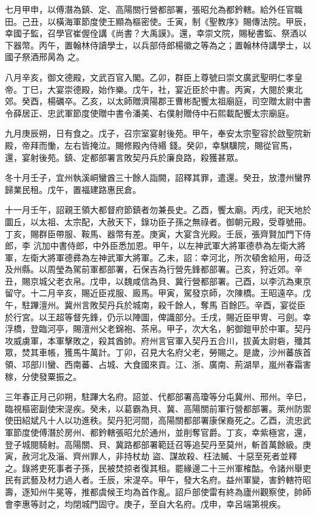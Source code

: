 \begin{pinyinscope}
 七月甲申，以傅潛為鎮、定、高陽關行營都部署，張昭允為都鈐轄。給外任官職田。己丑，以橫海軍節度使王顯為樞密使。壬寅，制《聖教序》賜傳法院。甲辰，幸國子監，召學官崔偓佺講《尚書？大禹謨》。還，幸崇文院，賜秘書監、祭酒以下器幣。丙午，置翰林侍讀學士，以兵部侍郎楊徽之等為之；置翰林侍講學士，以國子祭酒邢昺為
 之。



 八月辛亥，御文德殿，文武百官入閣。乙卯，群臣上尊號曰崇文廣武聖明仁孝皇帝。丁巳，大宴崇德殿，始作樂。戊午，社，宴近臣於中書。丙寅，大閱於東北郊。癸酉，楊礪卒。乙亥，以太師贈濟陽郡王曹彬配饗太祖廟庭，司空贈太尉中書令薛居正、忠武軍節度使贈中書令潘美、右僕射贈侍中石熙載配饗太宗廟庭。



 九月庚辰朔，日有食之。戊子，召宗室宴射後苑。甲午，奉安太宗聖容於啟聖院新殿，帝拜而慟，左右皆掩泣。賜修殿內侍緡
 錢。癸卯，幸騏驥院，賜從官馬，還，宴射後苑。鎮、定都部署言敗契丹兵於廉良路，殺獲甚眾。



 冬十月壬子，宜州執溪峒蠻酋三十餘人詣闕，詔釋其罪，遣還。癸丑，放澧州蠻界歸業民租。戊午，置福建路惠民倉。



 十一月壬午，詔親王領大都督府節鎮者勿兼長史。乙酉，饗太廟。丙戌，祀天地於圜丘，以太祖、太宗配，大赦天下，錄功臣子孫之無祿者。御朝元殿，受尊號冊。丁亥，賜群臣帶服、鞍馬、器幣有差。庚寅，大宴含光殿。壬辰，張齊賢加門下侍郎，李
 沆加中書侍郎，中外臣悉加恩。甲午，以左神武軍大將軍德恭為左衛大將軍，左衛大將軍德彞為左神武軍大將軍。乙未，詔：幸河北，所次頓舍給用，毋泛及州縣。以周瑩為駕前軍都部署，石保吉為行營先鋒都部署。己亥，狩近郊。辛丑，賜京城父老衣帛。戊申，以魏咸信為貝、冀行營都部署。己酉，以李沆為東京留守。十二月辛亥，賜近臣戎服、廄馬。甲寅，駕發京師，次陳橋。王昭遠卒。戊午，駐蹕澶州。冀州言敗契丹兵於城南，殺千餘人，奪馬
 百餘匹。辛酉，宴從臣於行宮。以王超等督先鋒，仍示以陣圖，俾識部分。壬戌，賜近臣甲冑、弓劍。幸浮橋，登臨河亭，賜澶州父老錦袍、茶帛。甲子，次大名，躬御鎧甲於中軍。契丹攻威虜軍，本軍擊敗之，殺其酋帥。府州言官軍入契丹五合川，拔黃太尉砦，殲其眾，焚其車帳，獲馬牛萬計。丁卯，召見大名府父老，勞賜之。是歲，沙州蕃族首領、邛部川蠻、西南蕃、占城、大食國來貢。江、浙、廣南、荊湖旱，嵐州春霜害稼，分使發粟振之。



 三年春正月己卯朔，駐蹕大名府。詔並、代都部署高瓊等分屯冀州、邢州。辛巳，臨視樞密副使宋湜疾。癸未，以葛霸為貝、冀、高陽關前軍行營都部署。萊州防禦使田紹斌凡十人以功進秩。契丹犯河間，高陽關都部署康保裔死之。乙酉，流忠武軍節度使傅潛於房州、都鈐轄張昭允於通州，並削奪官爵。丁亥，幸紫極宮，還，登子城閱騎射。高陽關、貝、冀路都部署範廷召等追契丹至莫州，斬首萬餘級。庚寅，赦河北及淄、齊州罪人，非持杖劫
 盜、謀故殺、枉法贓、十惡至死者並釋之。錄將吏死事者子孫，民被焚掠者復其租。罷緣邊二十三州軍榷酤。令諸州舉吏民有武藝及材力過人者。壬辰，宋湜卒。甲午，發大名府。益州軍變，害鈐轄符昭壽，逐知州牛冕等，推都虞候王均為首作亂。詔戶部使雷有終為廬州觀察使，帥師會李惠等討之，均閉城門固守。庚子，至自大名府。戊申，幸呂端第視疾。




\end{pinyinscope}
